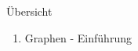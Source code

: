 \documentclass[../defence.tex]{subfiles}
\begin{document}
  \begin{frame}{Übersicht}
      \begin{enumerate}
        \item Graphen - Einführung
      \end{enumerate}
  \end{frame}
\end{document}
